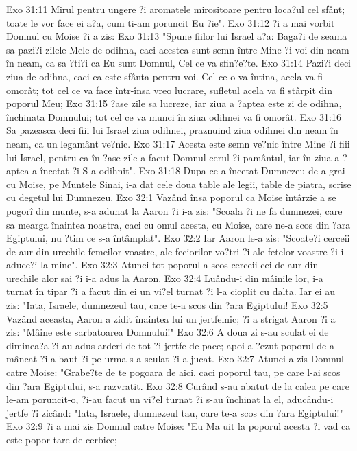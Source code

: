 Exo 31:11  Mirul pentru ungere ?i aromatele mirositoare pentru loca?ul cel sfânt; toate le vor face ei a?a, cum ti-am poruncit Eu ?ie".
Exo 31:12  ?i a mai vorbit Domnul cu Moise ?i a zis:
Exo 31:13  "Spune fiilor lui Israel a?a: Baga?i de seama sa pazi?i zilele Mele de odihna, caci acestea sunt semn între Mine ?i voi din neam în neam, ca sa ?ti?i ca Eu sunt Domnul, Cel ce va sfin?e?te.
Exo 31:14  Pazi?i deci ziua de odihna, caci ea este sfânta pentru voi. Cel ce o va întina, acela va fi omorât; tot cel ce va face într-însa vreo lucrare, sufletul acela va fi stârpit din poporul Meu;
Exo 31:15  ?ase zile sa lucreze, iar ziua a ?aptea este zi de odihna, închinata Domnului; tot cel ce va munci în ziua odihnei va fi omorât.
Exo 31:16  Sa pazeasca deci fiii lui Israel ziua odihnei, praznuind ziua odihnei din neam în neam, ca un legamânt ve?nic.
Exo 31:17  Acesta este semn ve?nic între Mine ?i fiii lui Israel, pentru ca în ?ase zile a facut Domnul cerul ?i pamântul, iar în ziua a ?aptea a încetat ?i S-a odihnit".
Exo 31:18  Dupa ce a încetat Dumnezeu de a grai cu Moise, pe Muntele Sinai, i-a dat cele doua table ale legii, table de piatra, scrise cu degetul lui Dumnezeu.
Exo 32:1  Vazând însa poporul ca Moise întârzie a se pogorî din munte, s-a adunat la Aaron ?i i-a zis: "Scoala ?i ne fa dumnezei, care sa mearga înaintea noastra, caci cu omul acesta, cu Moise, care ne-a scos din ?ara Egiptului, nu ?tim ce s-a întâmplat".
Exo 32:2  Iar Aaron le-a zis: "Scoate?i cerceii de aur din urechile femeilor voastre, ale feciorilor vo?tri ?i ale fetelor voastre ?i-i aduce?i la mine".
Exo 32:3  Atunci tot poporul a scos cerceii cei de aur din urechile alor sai ?i i-a adus la Aaron.
Exo 32:4  Luându-i din mâinile lor, i-a turnat în tipar ?i a facut din ei un vi?el turnat ?i l-a cioplit cu dalta. Iar ei au zis: "Iata, Israele, dumnezeul tau, care te-a scos din ?ara Egiptului!
Exo 32:5  Vazând aceasta, Aaron a zidit înaintea lui un jertfelnic; ?i a strigat Aaron ?i a zis: "Mâine este sarbatoarea Domnului!"
Exo 32:6  A doua zi s-au sculat ei de diminea?a ?i au adus arderi de tot ?i jertfe de pace; apoi a ?ezut poporul de a mâncat ?i a baut ?i pe urma s-a sculat ?i a jucat.
Exo 32:7  Atunci a zis Domnul catre Moise: "Grabe?te de te pogoara de aici, caci poporul tau, pe care l-ai scos din ?ara Egiptului, s-a razvratit.
Exo 32:8  Curând s-au abatut de la calea pe care le-am poruncit-o, ?i-au facut un vi?el turnat ?i s-au închinat la el, aducându-i jertfe ?i zicând: "Iata, Israele, dumnezeul tau, care te-a scos din ?ara Egiptului!"
Exo 32:9  ?i a mai zis Domnul catre Moise: "Eu Ma uit la poporul acesta ?i vad ca este popor tare de cerbice;
